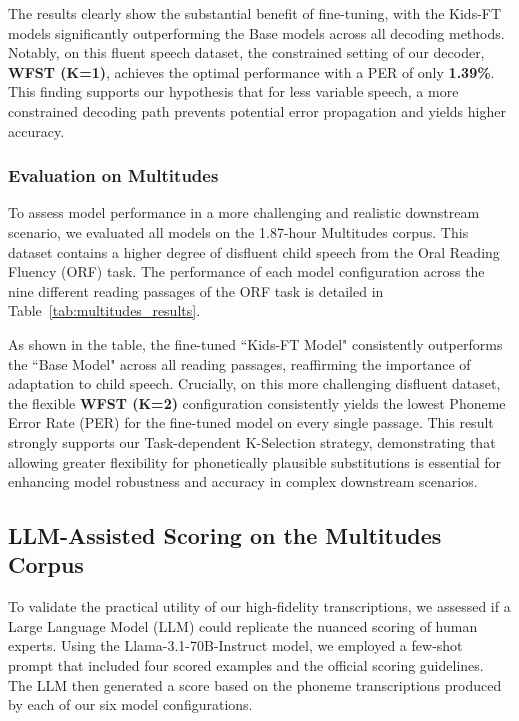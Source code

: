 The results clearly show the substantial benefit of fine-tuning, with the Kids-FT models significantly outperforming the Base models across all decoding methods. Notably, on this fluent speech dataset, the constrained setting of our decoder, \textbf{WFST (K=1)}, achieves the optimal performance with a PER of only \textbf{1.39\%}. This finding supports our hypothesis that for less variable speech, a more constrained decoding path prevents potential error propagation and yields higher accuracy.



\subsubsection{Evaluation on Multitudes}
To assess model performance in a more challenging and realistic downstream scenario, we evaluated all models on the 1.87-hour Multitudes corpus. This dataset contains a higher degree of disfluent child speech from the Oral Reading Fluency (ORF) task. The performance of each model configuration across the nine different reading passages of the ORF task is detailed in Table~\ref{tab:multitudes_results}.

As shown in the table, the fine-tuned ``Kids-FT Model" consistently outperforms the ``Base Model" across all reading passages, reaffirming the importance of adaptation to child speech. Crucially, on this more challenging disfluent dataset, the flexible \textbf{WFST (K=2)} configuration consistently yields the lowest Phoneme Error Rate (PER) for the fine-tuned model on every single passage. This result strongly supports our Task-dependent K-Selection strategy, demonstrating that allowing greater flexibility for phonetically plausible substitutions is essential for enhancing model robustness and accuracy in complex downstream scenarios.




\subsection{LLM-Assisted Scoring on the Multitudes Corpus}

To validate the practical utility of our high-fidelity transcriptions, we assessed if a Large Language Model (LLM) could replicate the nuanced scoring of human experts. Using the Llama-3.1-70B-Instruct model, we employed a few-shot prompt that included four scored examples and the official scoring guidelines. The LLM then generated a score based on the phoneme transcriptions produced by each of our six model configurations.

